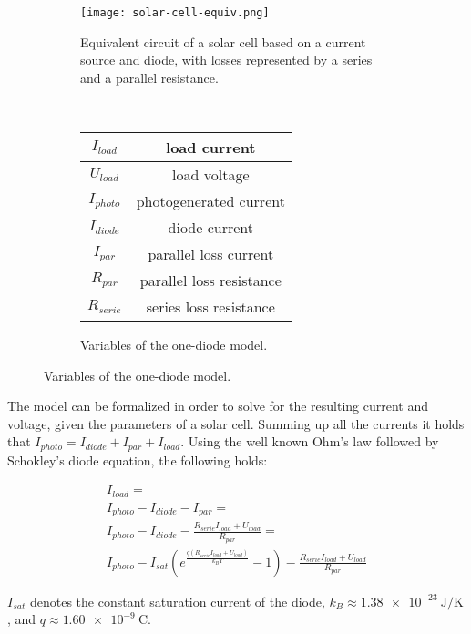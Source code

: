 \begin{figure}[!ht]
\centering
\begin{subfigure}{0.4\textwidth}
  \texttt{[image: solar-cell-equiv.png]}
  \caption[Equivalent circuit of a solar cell]{
    Equivalent circuit of a solar cell based on a current source and diode,
    with losses represented by a series and a parallel resistance.
  }
  \label{fig:solar-cell-equiv}
\end{subfigure}
~
\begin{subfigure}{0.4\textwidth}
  \begin{tabular}[b]{| c | c |}
  \hline
  $I_{load}$ & load current \\ \hline
  $U_{load}$ & load voltage\\ \hline
  $I_{photo}$ & photogenerated current \\ \hline
  $I_{diode}$ & diode current \\ \hline
  $I_{par}$ & parallel loss current \\ \hline
  $R_{par}$ & parallel loss resistance \\ \hline
  $R_{serie}$ & series loss resistance \\ \hline
  \end{tabular}
  \caption[solar-cell-variables]{Variables of the one-diode model.}
  \label{fig:one-diode-model-vars}
\end{subfigure}
\end{figure}

The model can be formalized in order to solve for the resulting current and voltage, given the parameters of a solar cell.
Summing up all the currents it holds that $I_{photo} = I_{diode} + I_{par} + I_{load}$.
Using the well known Ohm's law followed by Schokley's diode equation\cite{Walker2001}, the following holds:

\begin{multline}
\label{eq:eq-circuit}
I_{load} = \\
I_{photo} - I_{diode} - I_{par} = \\
I_{photo} - I_{diode} - \frac{R_{serie}I_{load} + U_{load}}{R_{par}} = \\
I_{photo} - I_{sat}(e^\frac{q(R_{serie}I_{load} + U_{load})}{k_B T} - 1) - \frac{R_{serie}I_{load} + U_{load}}{R_{par}}
\end{multline}

$I_{sat}$ denotes the constant saturation current of the diode,
$k_B \approx \SI{1.38e-23}{\joule\per\kelvin}$,
and $q \approx \SI{1.60e-9}{\coulomb}$.

